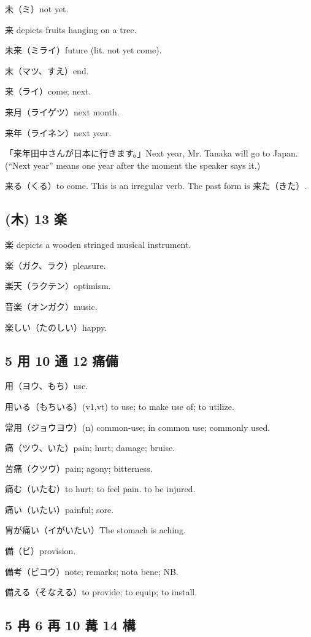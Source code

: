 未（ミ）not yet.

来 depicts fruits hanging on a tree.

未来（ミライ）future (lit. not yet come).

末（マツ、すえ）end.

来（ライ）come; next.

来月（ライゲツ）next month.

来年（ライネン）next year.

「来年田中さんが日本に行きます。」Next year, Mr. Tanaka will go to Japan.
(``Next year'' means one year after the moment the speaker says it.)

来る（くる）to come.
This is an irregular verb.
The past form is 来た（きた）.

\subsection{(木) 13 楽}

楽 depicts a wooden stringed musical instrument.

楽（ガク、ラク）pleasure.

楽天（ラクテン）optimism.

音楽（オンガク）music.

楽しい（たのしい）happy.

\subsection{5 用 10 通 12 痛備}

用（ヨウ、もち）use.

用いる（もちいる）(v1,vt) to use; to make use of; to utilize.

常用（ジョウヨウ）(n) common-use; in common use; commonly used.

痛（ツウ、いた）pain; hurt; damage; bruise.

苦痛（クツウ）pain; agony; bitterness.

痛む（いたむ）to hurt; to feel pain. to be injured.

痛い（いたい）painful; sore.

胃が痛い（イがいたい）The stomach is aching.

備（ビ）provision.

備考（ビコウ）note; remarks; nota bene; NB.

備える（そなえる）to provide; to equip; to install.

\subsection{5 冉 6 再 10 冓 14 構}

